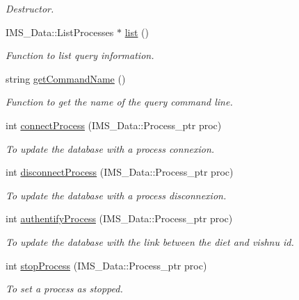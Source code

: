 \begin{DoxyCompactItemize}
\begin{DoxyCompactList}\small\item\em Destructor. \item\end{DoxyCompactList}\item 
IMS\_\-Data::ListProcesses $\ast$ \hyperlink{classProcessServer_a2b239564623f2866f884b2774b50a258}{list} ()
\begin{DoxyCompactList}\small\item\em Function to list query information. \item\end{DoxyCompactList}\item 
string \hyperlink{classProcessServer_a19a98c66886027c2d3fa019e7ce77784}{getCommandName} ()
\begin{DoxyCompactList}\small\item\em Function to get the name of the query command line. \item\end{DoxyCompactList}\item 
int \hyperlink{classProcessServer_affb3bba539691ff8e05890a9a98cea7a}{connectProcess} (IMS\_\-Data::Process\_\-ptr proc)
\begin{DoxyCompactList}\small\item\em To update the database with a process connexion. \item\end{DoxyCompactList}\item 
int \hyperlink{classProcessServer_aab1bad8a4cad8bea3db7a5fbe220e37a}{disconnectProcess} (IMS\_\-Data::Process\_\-ptr proc)
\begin{DoxyCompactList}\small\item\em To update the database with a process disconnexion. \item\end{DoxyCompactList}\item 
int \hyperlink{classProcessServer_a6606327ead9ca6bd50d195587f3d8d66}{authentifyProcess} (IMS\_\-Data::Process\_\-ptr proc)
\begin{DoxyCompactList}\small\item\em To update the database with the link between the diet and vishnu id. \item\end{DoxyCompactList}\item 
int \hyperlink{classProcessServer_a4ba31bc3a4c161334f65ff97ad5bed5f}{stopProcess} (IMS\_\-Data::Process\_\-ptr proc)
\begin{DoxyCompactList}\small\item\em To set a process as stopped. \item\end{DoxyCompactList}\item 

\end{DoxyCompactItemize}
